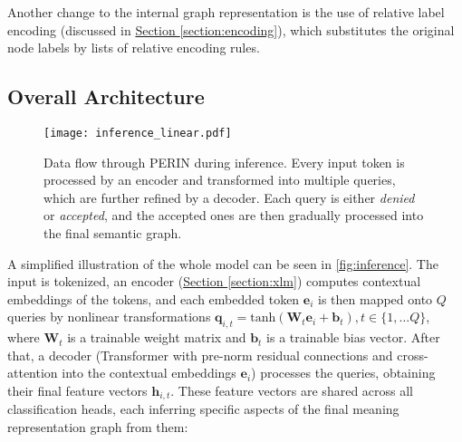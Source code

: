 \documentclass[11pt,a4paper]{article}
\newcommand{\secref}[1]{\hyperref[#1]{Section \ref*{#1}}}
\begin{document}
Another change to the internal graph representation is the use of relative label encoding (discussed in \secref{section:encoding}), which substitutes the original node labels by lists of relative encoding rules.

 \subsection{Overall Architecture}
\label{sec:overall_architecture}

\begin{figure}[t]
\texttt{[image: inference\_linear.pdf]}
\caption{Data flow through PERIN during inference. Every input token is processed by an encoder and transformed into multiple queries, which are further refined by a decoder. Each query is either \emph{denied} or \emph{accepted}, and the accepted ones are then gradually processed into the final semantic graph.}
\label{fig:inference}
\end{figure}


A simplified illustration of the whole model can be seen in \autoref{fig:inference}. The input is tokenized, an
encoder (\secref{section:xlm}) computes
contextual embeddings of the tokens, and each embedded token $\textbf{e}_i$ is then mapped onto $Q$ queries by nonlinear transformations $\textbf{q}_{i,t} = \textrm{tanh}\left(\textbf{W}_t\textbf{e}_i + \textbf{b}_t\right), t \in \{1,\dots Q\}$, where $\textbf{W}_t$ is a trainable weight matrix and $\textbf{b}_t$ is a trainable bias vector. After that, a decoder (Transformer with pre-norm residual connections \cite{nguyen2019transformers} and cross-attention into the contextual embeddings $\textbf{e}_i$) processes the queries, obtaining their final feature vectors $\textbf{h}_{i,t}$. These feature vectors are shared across all classification heads, each inferring specific aspects of the final meaning representation graph from them:
\end{document}
